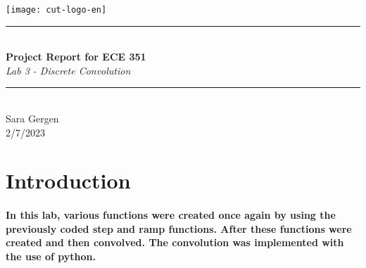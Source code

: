 \documentclass[12pt,a4paper]{article}
\newcommand{\HRule}{\rule{\linewidth}{0.5mm}}
\begin{document}
\begin{titlepage}
\begin{center}

\texttt{[image: cut-logo-en]}~\\[2cm]


\HRule \\[0.4cm]
{ \LARGE 
  \textbf{Project Report for ECE 351}\\[0.4cm]
  \emph{Lab 3 - Discrete Convolution}\\[0.4cm]
}
\HRule \\[1.5cm]



{ \large
  Sara Gergen \\[0.1cm]
  2/7/2023\\[0.1cm]
}

\vfill



\end{center}
\end{titlepage}


\newpage



\tableofcontents
{}
\newpage
\setcounter{page}{1}

\section{Introduction}\label{sec:intro}

\paragraph{In this lab, various functions were created once again by using the previously coded step and ramp functions. After these functions were created and then convolved. The  convolution was implemented with the use of python.}
\end{document}
